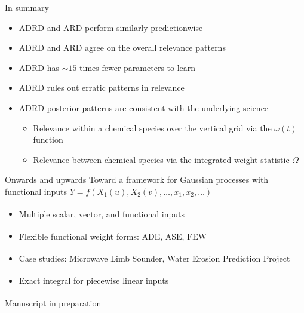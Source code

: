 \documentclass[final]{beamer}
\begin{document}
\begin{frame}[t]
{\begin{minipage}[t][76cm][t]{58cm}
\begin{minipage}[t]{58cm}
\begin{minipage}[t]{28cm}
          \begin{block}{In summary}
            \begin{itemize}
            \item ADRD and ARD perform similarly predictionwise
            \item ADRD and ARD agree on the overall relevance patterns
            \item ADRD has $\sim15$ times fewer parameters to learn
            \item ADRD rules out erratic patterns in relevance
            \item ADRD posterior patterns are consistent with the underlying
              science
              \begin{itemize}
              \item Relevance within a chemical species over the vertical grid
                via the $\omega(t)$ function
              \item Relevance between chemical species via the integrated weight
                statistic $\Omega$
              \end{itemize}
            \end{itemize}
          \end{block}
        \end{minipage}
        \begin{minipage}[t]{28cm}
          \begin{block}{Onwards and upwards}
            Toward a framework for Gaussian processes with functional inputs
            $Y = f(X_1(u), X_2(v), \dots, x_1, x_2, \dots)$

            \begin{itemize}
            \item Multiple scalar\textsuperscript{\ddag}, vector, and functional inputs
            \item Flexible functional weight forms: ADE, ASE, FEW\textsuperscript{\ddag}
            \item Case studies: Microwave Limb Sounder,
              Water Erosion Prediction Project\textsuperscript{\ddag}
            \item Exact integral for piecewise linear inputs\textsuperscript{\ddag}
            \end{itemize}

            \textsuperscript{\ddag} Manuscript in preparation
          \end{block}


\end{minipage}
\end{minipage}
\end{minipage}}
\end{frame}
\end{document}
